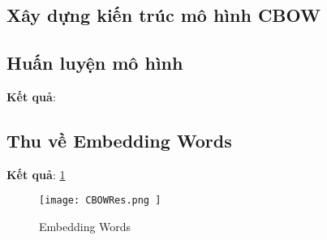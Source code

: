 \subsection{Xây dựng kiến trúc mô hình CBOW}


\subsection{Huấn luyện mô hình}

\textbf{Kết quả}:


\subsection{Thu về Embedding Words}

\textbf{Kết quả}: \ref{CBOWRes}
\begin{figure}[h!]
	\centering
	\texttt{[image: 
		CBOWRes.png
	]}
	\caption[Embedding Words]{
		Embedding Words \label{CBOWRes}
	}
\end{figure}




